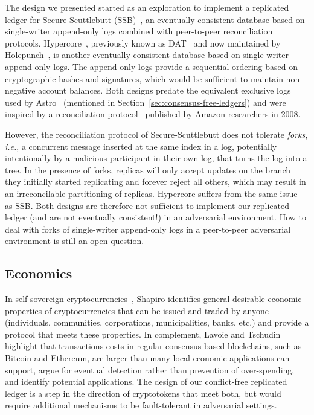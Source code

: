 \documentclass[9pt]{article}   	%
\begin{document}
The design we presented started as an exploration to implement a replicated ledger for Secure-Scuttlebutt (SSB)~\cite{kermarrec2020gossiping,tarr2019ssb}, an eventually consistent database based on single-writer append-only logs combined with peer-to-peer reconciliation protocols. Hypercore~\cite{hypercore-website}, previously known as DAT~\cite{ogden2017dat,robinson2018dat} and now maintained by Holepunch~\cite{holepunch-website}, is another eventually consistent database based on single-writer append-only logs. The append-only logs provide a sequential ordering based on cryptographic hashes and signatures, which would be sufficient to maintain non-negative account balances.  Both designs predate the equivalent exclusive logs used by Astro~\cite{collins2020broadcast-payment} (mentioned in Section~\ref{sec:consensus-free-ledgers}) and were inspired by a reconciliation protocol~\cite{vanRenesse2008reconciliation} published by Amazon researchers in 2008. 

However, the reconciliation protocol of Secure-Scuttlebutt does not tolerate \textit{forks}, \textit{i.e.}, a concurrent message inserted at the same index in a log, potentially intentionally by a malicious participant in their own log, that turns the log into a tree. In the presence of forks, replicas will only accept updates on the branch they initially started replicating and forever reject all others, which may result in an irreconcilable partitioning of replicas.  Hypercore suffers from the same issue~\cite{hypercore-handling-conflicts,hypercore-split-resolution-dep}  as SSB. Both designs are therefore not sufficient to implement our replicated ledger (and are not eventually consistent!) in an adversarial environment. How to deal with forks of single-writer append-only logs in a peer-to-peer adversarial environment is still an open question.

\subsection{Economics}
\label{sec:economics}

In self-sovereign cryptocurrencies~\cite{shapiro2023sovereign}, Shapiro identifies general desirable economic properties of cryptocurrencies that can be issued and traded by anyone (individuals, communities, corporations, municipalities, banks, etc.) and provide a protocol that meets these properties. In complement, Lavoie and Tschudin~\cite{lavoie2022localcryptotokens} highlight that transactions costs in regular consensus-based blockchains, such as Bitcoin and Ethereum, are larger than many local economic applications can support, argue for eventual detection rather than prevention of over-spending, and identify potential applications. The design of our conflict-free replicated ledger is a step in the direction of cryptotokens that meet both, but would require additional mechanisms to be fault-tolerant in adversarial settings.
\end{document}
